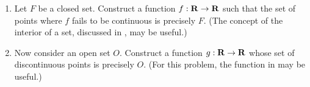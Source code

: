 \documentclass{lew98_solutions}
\begin{document}
\begin{exercise}
\label{ex:4.3.14}
    \begin{enumerate}
        \item Let \( F \) be a closed set. Construct a function \( f : \mathbf{R} \to \mathbf{R} \) such that the set of points where \( f \) fails to be continuous is precisely \( F \). (The concept of the interior of a set, discussed in , may be useful.)

        \item Now consider an open set \( O \). Construct a function \( g : \mathbf{R} \to \mathbf{R} \) whose set of discontinuous points is precisely \( O \). (For this problem, the function in  may be useful.)
    \end{enumerate}
\end{exercise}
\end{document}
